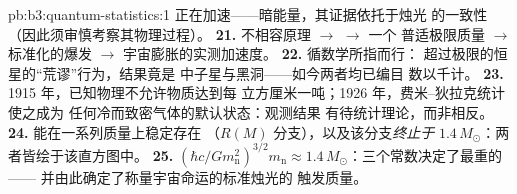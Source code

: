 \begin{solution}{pb:b3:quantum-statistics:1}
正在加速——暗能量，其证据依托于烛光
的一致性（因此须审慎考察其物理过程）。
\textbf{21.} 不相容原理 $\to$  $\to$ 一个
普适极限质量 $\to$ 标准化的爆发 $\to$
宇宙膨胀的实测加速度。
\textbf{22.} 循数学所指而行：
超过极限的恒星的“荒谬”行为，结果竟是
中子星与黑洞——如今两者均已编目
数以千计。
\textbf{23.} 1915 年，已知物理不允许物质达到每
立方厘米一吨；1926 年，费米–狄拉克统计使之成为
任何冷而致密气体的默认状态：观测结果
有待统计理论，而非相反。
\textbf{24.} 能在一系列质量上稳定存在
（$R(M)$ 分支），以及该分支\emph{终止于}
$1.4\,M_\odot$：两者皆绘于该直方图中。
\textbf{25.} $(\hbar c/Gm_{\text{n}}^2)^{3/2}m_{\text{n}} \approx
1.4\,M_\odot$：三个常数决定了最重的——
并由此确定了称量宇宙命运的标准烛光的
触发质量。
\end{solution}
